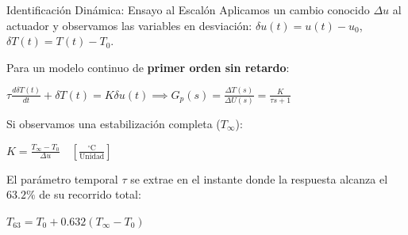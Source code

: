 \documentclass[aspectratio=169, xcolor={table,xcdraw}]{beamer}
\begin{document}
\begin{frame}{Identificación Dinámica: Ensayo al Escalón}
    Aplicamos un cambio conocido $\Delta u$ al actuador y observamos las variables en desviación: $\delta u(t) = u(t) - u_0$, $\delta T(t) = T(t) - T_0$.
    
    \vspace{0.3cm}
    Para un modelo continuo de \textbf{primer orden sin retardo}:
    
    \vspace{0.2cm}
    {\centering $\displaystyle \tau \frac{d\delta T(t)}{dt} + \delta T(t) = K \delta u(t) \implies G_p(s) = \frac{\Delta T(s)}{\Delta U(s)} = \frac{K}{\tau s + 1}$ \par}
    
    \vspace{0.3cm}
    Si observamos una estabilización completa ($T_\infty$):
    
    \vspace{0.2cm}
    {\centering $\displaystyle K = \frac{T_\infty - T_0}{\Delta u} \quad \left[ \frac{^\circ\text{C}}{\text{Unidad}} \right]$ \par}
    
    \vspace{0.3cm}
    El parámetro temporal $\tau$ se extrae en el instante donde la respuesta alcanza el $63.2\%$ de su recorrido total:
    
    \vspace{0.2cm}
    {\centering $\displaystyle T_{63} = T_0 + 0.632(T_\infty - T_0)$ \par}
\end{frame}
\end{document}
